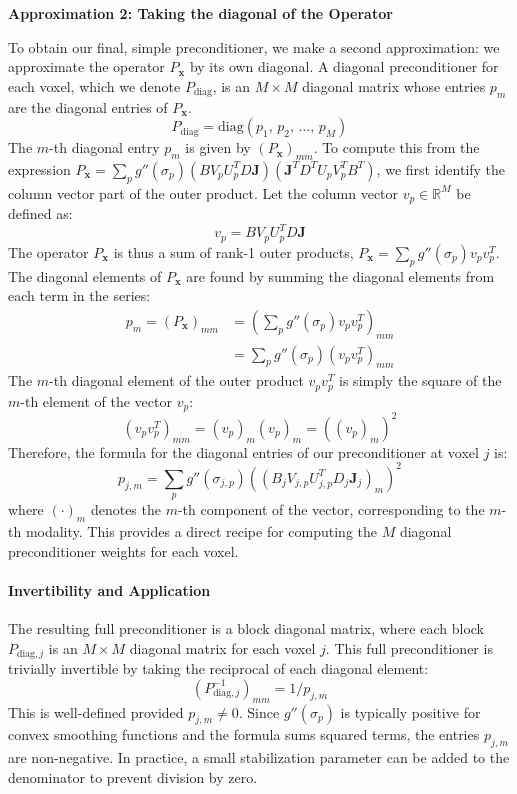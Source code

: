 \textbf{Approximation 2: Taking the diagonal of the Operator}

To obtain our final, simple preconditioner, we make a second approximation: we approximate the operator $P_{\mathbf{x}}$ by its own diagonal. A diagonal preconditioner for each voxel, which we denote $P_{\text{diag}}$, is an $M \times M$ diagonal matrix whose entries $p_{m}$ are the diagonal entries of $P_{\mathbf{x}}$.
\[P_{\text{diag}} = \text{diag}( p_{1},\, p_{2},\, \dots,\, p_{M} )\]
The $m$-th diagonal entry $p_{m}$ is given by $(P_{\mathbf{x}})_{mm}$. To compute this from the expression $P_{\mathbf{x}} = \sum_p g''(\sigma_p) (B V_p U_p^T D \mathbf{J}) (\mathbf{J}^T D^T U_p V_p^T B^T)$, we first identify the column vector part of the outer product. Let the column vector $v_p \in \mathbb{R}^M$ be defined as:
\[v_p = B V_p U_p^T D \mathbf{J}\]
The operator $P_{\mathbf{x}}$ is thus a sum of rank-1 outer products, $P_{\mathbf{x}} = \sum_p g''(\sigma_p) v_p v_p^T$. The diagonal elements of $P_{\mathbf{x}}$ are found by summing the diagonal elements from each term in the series:
\begin{align*}
p_{m} = (P_{\mathbf{x}})_{mm} &= \left( \sum_p g''(\sigma_p) v_p v_p^T \right)_{mm} \\
&= \sum_p g''(\sigma_p) (v_p v_p^T)_{mm}
\end{align*}
The $m$-th diagonal element of the outer product $v_p v_p^T$ is simply the square of the $m$-th element of the vector $v_p$:
\[ (v_p v_p^T)_{mm} = (v_p)_m (v_p)_m = \left((v_p)_m\right)^2 \]
Therefore, the formula for the diagonal entries of our preconditioner at voxel $j$ is:
\[p_{j,m} = \sum_p g''(\sigma_{j,p}) \left( (B_j V_{j,p} U_{j,p}^T D_j \mathbf{J}_j)_m \right)^2\]
where $( \cdot )_m$ denotes the $m$-th component of the vector, corresponding to the $m$-th modality. This provides a direct recipe for computing the $M$ diagonal preconditioner weights for each voxel.

\paragraph{Invertibility and Application}
The resulting full preconditioner is a block diagonal matrix, where each block $P_{\text{diag},j}$ is an $M \times M$ diagonal matrix for each voxel $j$. This full preconditioner is trivially invertible by taking the reciprocal of each diagonal element:
$$ (P_{\text{diag},j}^{-1})_{mm} = 1/p_{j,m} $$
This is well-defined provided $p_{j,m} \neq 0$. Since $g''(\sigma_p)$ is typically positive for convex smoothing functions and the formula sums squared terms, the entries $p_{j,m}$ are non-negative. In practice, a small stabilization parameter can be added to the denominator to prevent division by zero.

